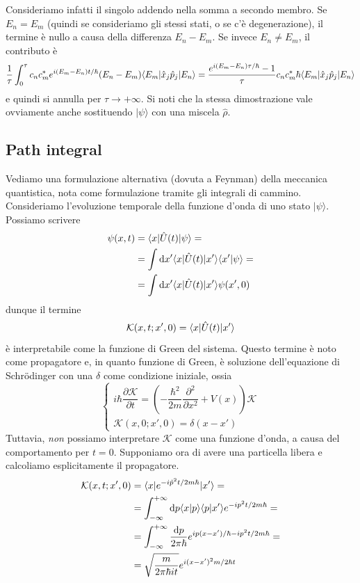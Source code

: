 \documentclass[a4paper, 11pt]{article}
\renewcommand{\ket}[1]{| #1\rangle}
\begin{document}
Consideriamo infatti il singolo addendo nella somma a secondo membro. Se $E_n=E_m$ (quindi se consideriamo gli stessi stati, o se c'è degenerazione), il termine è nullo a causa della differenza $E_n-E_m$. Se invece $E_n\neq E_m$, il contributo è
\[\frac{1}{\tau}\int_{0}^{\tau}c_nc_m^*e^{i(E_m-E_n)t/\hbar}(E_n-E_m)\langle E_m|\hat x_j\hat p_j|E_n\rangle=\frac{e^{i(E_m-E_n)\tau/\hbar}-1}{\tau}c_nc_m^*\hbar\langle E_m|\hat x_j\hat p_j|E_n\rangle\]
e quindi si annulla per $\tau\to+\infty$. Si noti che la stessa dimostrazione vale ovviamente anche sostituendo $\ket\psi$ con una miscela $\hat{\rho}$.
\subsection{Path integral}
Vediamo una formulazione alternativa (dovuta a Feynman) della meccanica quantistica, nota come formulazione tramite gli integrali di cammino. Consideriamo l'evoluzione temporale della funzione d'onda di uno stato $\ket\psi$. Possiamo scrivere
\begin{align*}
	\psi(x,t)&=\langle x|\hat U(t)|\psi\rangle=\\&=\int \mathrm{d} x'\langle x|\hat U(t)|x'\rangle\langle x'\vert\psi\rangle=\\&=\int\mathrm{d} x'\langle x|\hat U(t)|x'\rangle\psi(x',0)
\end{align*}
dunque il termine
\[\mathcal{K}(x,t;x',0)=\langle x|\hat{U}(t)|x'\rangle\]
è interpretabile come la funzione di Green del sistema. Questo termine è noto come propagatore e, in quanto funzione di Green, è soluzione dell'equazione di Schr\"odinger con una $\delta$ come condizione iniziale, ossia
\[\begin{cases}
i\hbar\dfrac{\partial\mathcal{K}}{\partial t}=\left(-\dfrac{\hbar^2}{2m}\dfrac{\partial^2}{\partial x^2}+V(x)\right)\mathcal{K}\\\mathcal{K}(x,0;x',0)=\delta(x-x')
\end{cases}\]
Tuttavia, \emph{non} possiamo interpretare $\mathcal{K}$ come una funzione d'onda, a causa del comportamento per $t=0$. Supponiamo ora di avere una particella libera e calcoliamo esplicitamente il propagatore.
\begin{align*}
	\mathcal{K}(x,t;x',0)&=\langle x|e^{-i\hat{p}^2t/2m\hbar}|x'\rangle=\\&=\int_{-\infty}^{+\infty} \mathrm{d} p\langle x\vert p\rangle\langle p\vert x'\rangle e^{-ip^2t/2m\hbar}=\\&=\int_{-\infty}^{+\infty}\frac{\mathrm{d} p}{2\pi\hbar} e^{ip(x-x')/\hbar-ip^2t/2m\hbar}=\\&=\sqrt{\frac{m}{2\pi\hbar it}}e^{i(x-x')^2m/2\hbar t}
\end{align*}
\end{document}
